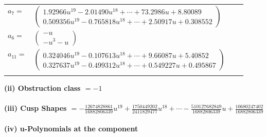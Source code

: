 \documentclass[1p]{elsarticle_modified}
\theoremstyle{definition}
\begin{document}
\begin{tabular}{m{7pt} m{180pt} m{7pt} m{180pt} }
\flushright $a_{7}=$&$\begin{pmatrix}1.92966 u^{19}-2.01490 u^{18}+\cdots+73.2986 u+8.80089\\0.509356 u^{19}-0.765818 u^{18}+\cdots+2.50917 u+0.308552\end{pmatrix}$ \\
\flushright $a_{6}=$&$\begin{pmatrix}- u\\- u^3- u\end{pmatrix}$ \\
\flushright $a_{11}=$&$\begin{pmatrix}0.324046 u^{19}-0.107613 u^{18}+\cdots+9.66087 u+5.40852\\0.327637 u^{19}-0.499312 u^{18}+\cdots+0.549227 u+0.495867\end{pmatrix}$\\&\end{tabular}
\flushleft \textbf{(ii) Obstruction class $= -1$}\\~\\
\flushleft \textbf{(iii) Cusp Shapes $= -\frac{12674828861}{16882806339} u^{19}+\frac{1750449202}{2411829477} u^{18}+\cdots-\frac{510127682849}{16882806339} u+\frac{10680247402}{16882806339}$}\\~\\
\newpage\renewcommand{\arraystretch}{1}
\flushleft \textbf{(iv) u-Polynomials at the component}\newline \\
\end{document}
